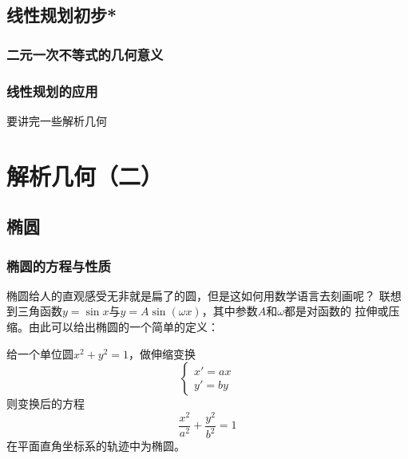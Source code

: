 \section{线性规划初步*}
\subsection{二元一次不等式的几何意义}
\clearpage
\subsection{线性规划的应用}
要讲完一些解析几何
\clearpage

\chapter{解析几何（二）}

\clearpage

\section{椭圆}
\subsection{椭圆的方程与性质}
椭圆给人的直观感受无非就是扁了的圆，但是这如何用数学语言去刻画呢？
联想到三角函数\(y=\sin x\)与\(y=A\sin(\omega x)\)，其中参数\(A\)和$\omega$都是对函数的
拉伸或压缩。由此可以给出椭圆的一个简单的定义：
\begin{definition}[椭圆的第零定义]
    给一个单位圆\(x^2+y^2=1\)，做伸缩变换
    \[ \left\{
        \begin{array} { l } 
        x'=a x\\
        y'=b y
        \end{array}
    \right.\]
    则变换后的方程
    \[\frac{x^2}{a^2}+\frac{y^2}{b^2}=1\]在平面直角坐标系的轨迹中为椭圆。
\end{definition}

